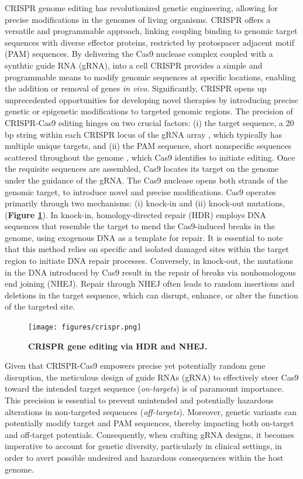 \documentclass[a4paper, titlepage, openright]{book}
\begin{document}
CRISPR genome editing \citep{cong2013multiplex} has revolutionized genetic engineering, allowing for precise modifications in the genomes of living organisms. CRISPR offers a versatile and programmable approach, linking coupling binding to genomic target sequences with diverse effector proteins, restricted by protospacer adjacent motif (PAM) sequences.  By delivering the Cas9 nuclease complex coupled with a synthtic guide RNA (gRNA), into a cell CRISPR provides a simple and programmable means to modify genomic sequences at specific locations, enabling the addition or removal of genes \emph{in vivo}. Significantly, CRISPR opens up unprecedented opportunities for developing novel therapies by introducing precise genetic or epigenetic modifications to targeted genomic regions. The precision of CRISPR-Cas9 editing hinges on two crucial factors: (i) the target sequence, a 20 bp string within each CRISPR locus of the gRNA array \citep{ran2013genome}, which typically has multiple unique targets, and (ii) the PAM sequence, short nonspecific sequences scattered throughout the genome \citep{ran2013genome}, which Cas9 identifies to initiate editing. Once the requisite sequences are assembled, Cas9 locates its target on the genome under the guidance of the gRNA. The Cas9 nuclease opens both strands of the genomic target, to introduce novel and precise modifications. Cas9 operates primarily through two mechanisms: (i) knock-in and (ii) knock-out mutations,(\textbf{Figure \ref{fig:crispr}}). In knock-in, homology-directed repair (HDR) employs DNA sequences that resemble the target to mend the Cas9-induced breaks in the genome, using exogenous DNA as a template for repair. It is essential to note that this method relies on specific and isolated damaged sites within the target region to initiate DNA repair processes. Conversely, in knock-out, the mutations in the DNA introduced by Cas9 result in the repair of breaks via nonhomologous end joining (NHEJ). Repair through NHEJ often leads to random insertions and deletions in the target sequence, which can disrupt, enhance, or alter the function of the targeted site.
\begin{figure}
	\centering
	\texttt{[image: figures/crispr.png]}
	\caption[CRISPR gene editing via HDR and NHEJ]{\textbf{CRISPR gene editing via HDR and NHEJ.}}
	\label{fig:crispr}
\end{figure} 
Given that CRISPR-Cas9 empowers precise yet potentially random gene disruption, the meticulous design of guide RNAs (gRNA) to effectively steer Cas9 toward the intended target sequence (\emph{on-targets}) is of paramount importance. This precision is essential to prevent unintended and potentially hazardous alterations in non-targeted sequences (\emph{off-targets}). Moreover, genetic variants can potentially modify target and PAM sequences, thereby impacting both on-target and off-target potentials. Consequently, when crafting gRNA designs, it becomes imperative to account for genetic diversity, particularly in clinical settings, in order to avert possible undesired and hazardous consequences within the host genome.
\end{document}
